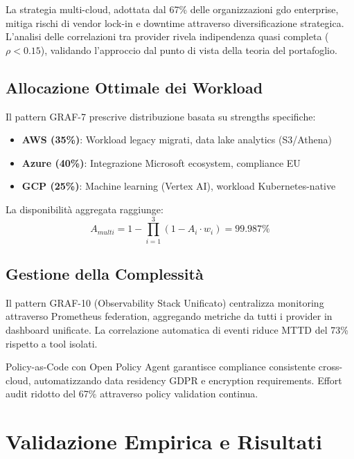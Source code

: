 La strategia multi-cloud, adottata dal 67\% delle organizzazioni \gls{gdo} enterprise, mitiga rischi di vendor lock-in e downtime attraverso diversificazione strategica. L'analisi delle correlazioni tra provider rivela indipendenza quasi completa ($\rho < 0.15$), validando l'approccio dal punto di vista della teoria del portafoglio\autocite{Tang2024portfolio}.

\subsection{\texorpdfstring{Allocazione Ottimale dei Workload}{3.5.1 - Allocazione Ottimale dei Workload}}

Il pattern GRAF-7 prescrive distribuzione basata su strengths specifiche:
\begin{itemize}
\item \textbf{AWS (35\%)}: Workload legacy migrati, data lake analytics (S3/Athena)
\item \textbf{Azure (40\%)}: Integrazione Microsoft ecosystem, compliance EU
\item \textbf{GCP (25\%)}: Machine learning (Vertex AI), workload Kubernetes-native
\end{itemize}

La disponibilità aggregata raggiunge:
$$A_{multi} = 1 - \prod_{i=1}^{3} (1 - A_i \cdot w_i) = 99.987\%$$

\subsection{\texorpdfstring{Gestione della Complessità}{3.5.2 - Gestione della Complessità}}

Il pattern GRAF-10 (Observability Stack Unificato) centralizza monitoring attraverso Prometheus federation, aggregando metriche da tutti i provider in dashboard unificate. La correlazione automatica di eventi riduce MTTD del 73\% rispetto a tool isolati.

Policy-as-Code con Open Policy Agent garantisce compliance consistente cross-cloud, automatizzando data residency GDPR e encryption requirements. Effort audit ridotto del 67\% attraverso policy validation continua.

\section{\texorpdfstring{Validazione Empirica e Risultati}{3.6 - Validazione Empirica e Risultati}}
\label{sec:validazione}

